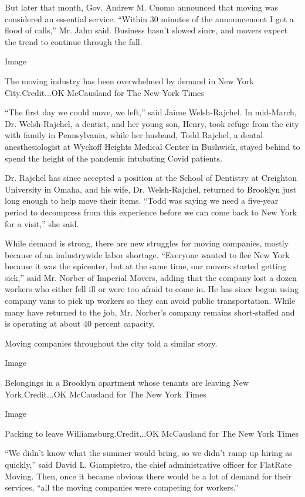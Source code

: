 But later that month, Gov. Andrew M. Cuomo announced that moving was
considered an essential service. ``Within 30 minutes of the announcement
I got a flood of calls,'' Mr. Jahn said. Business hasn't slowed since,
and movers expect the trend to continue through the fall.

Image

The moving industry has been overwhelmed by demand in New York
City.Credit...OK McCausland for The New York Times

``The first day we could move, we left,'' said Jaime Welsh-Rajchel. In
mid-March, Dr. Welsh-Rajchel, a dentist, and her young son, Henry, took
refuge from the city with family in Pennsylvania, while her husband,
Todd Rajchel, a dental anesthesiologist at Wyckoff Heights Medical
Center in Bushwick, stayed behind to spend the height of the pandemic
intubating Covid patients.

Dr. Rajchel has since accepted a position at the School of Dentistry at
Creighton University in Omaha, and his wife, Dr. Welsh-Rajchel, returned
to Brooklyn just long enough to help move their items. ``Todd was saying
we need a five-year period to decompress from this experience before we
can come back to New York for a visit,'' she said.

While demand is strong, there are new struggles for moving companies,
mostly because of an industrywide labor shortage. ``Everyone wanted to
flee New York because it was the epicenter, but at the same time, our
movers started getting sick,'' said Mr. Norber of Imperial Movers,
adding that the company lost a dozen workers who either fell ill or were
too afraid to come in. He has since begun using company vans to pick up
workers so they can avoid public transportation. While many have
returned to the job, Mr. Norber's company remains short-staffed and is
operating at about 40 percent capacity.

Moving companies throughout the city told a similar story.

Image

Belongings in a Brooklyn apartment whose tenants are leaving New
York.Credit...OK McCausland for The New York Times

Image

Packing to leave Williamsburg.Credit...OK McCausland for The New York
Times

``We didn't know what the summer would bring, so we didn't ramp up
hiring as quickly,'' said David L. Giampietro, the chief administrative
officer for FlatRate Moving. Then, once it became obvious there would be
a lot of demand for their services, ``all the moving companies were
competing for workers.''

